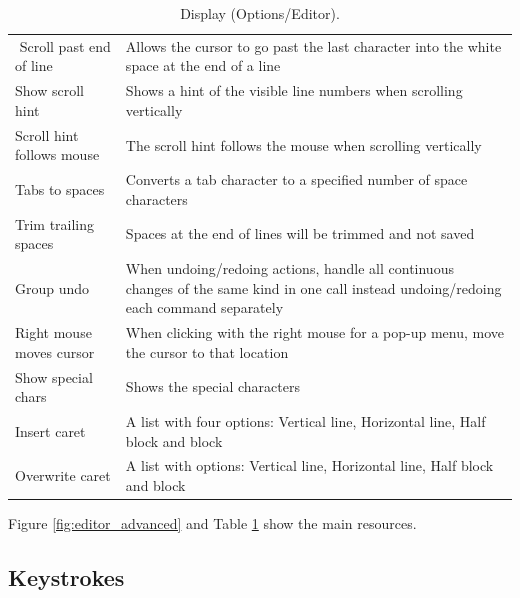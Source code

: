 \begin{table}
\begin{footnotesize}
\begin{tabularx}{\headwidth}{lX}
$$      Scroll past end of line & Allows the cursor to go past the last character into the white space at the end of a line \\
      Show scroll hint & Shows a hint of the visible line numbers when scrolling vertically \\
      Scroll hint follows mouse & The scroll hint follows the mouse when scrolling vertically \\
      Tabs to spaces & Converts a tab character to a specified number of space characters \\
      Trim trailing spaces & Spaces at the end of lines will be trimmed and not saved \\
      Group undo & When undoing/redoing actions, handle all continuous changes of the same kind in one call instead undoing/redoing
      each command separately \\
      Right mouse moves cursor & When clicking with the right mouse for a pop-up menu, move the cursor to that location \\
      Show special chars & Shows the special characters \\
      \hline %
      Insert caret & A list with four options: Vertical line, Horizontal line, Half block and block \\
      Overwrite caret & A list with options: Vertical line, Horizontal line, Half block and block \\
      \hline
    \end{tabularx}
  \end{footnotesize}
  \caption{Display (Options/Editor).}
  \label{tab:editor_advanced}
\end{table}

Figure \ref{fig:editor_advanced} and
Table \ref{tab:editor_advanced}
show the main resources.


\hypertarget{working_editor_keystrokes}{}
\subsection{Keystrokes}


